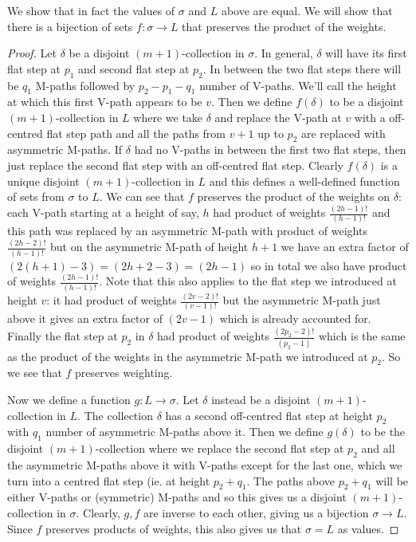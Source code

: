 \documentclass[11pt]{article}
\theoremstyle{mythm}
\begin{document}
We show that in fact the values of $\sigma$ and $L$ above are equal. We will show that there is a bijection of sets $f:\sigma \to L$ that preserves the product of the weights.

\begin{proof}
Let $\delta$ be a disjoint $(m+1)$-collection in $\sigma$. In general, $\delta$ will have its first flat step at $p_1$ and second flat step at $p_2$. In between the two flat steps there will be $q_1$ M-paths followed by $p_2-p_1-q_1$ number of V-paths. We'll call the height at which this first V-path appears to be $v$. Then we define $f(\delta)$ to be a disjoint $(m+1)$-collection in $L$ where we take $\delta$ and replace the V-path at $v$ with a off-centred flat step path and all the paths from $v+1$ up to $p_2$ are replaced with asymmetric M-paths. If $\delta$ had no V-paths in between the first two flat steps, then just replace the second flat step with an off-centred flat step. Clearly $f(\delta)$ is a unique disjoint $(m+1)$-collection in $L$ and this defines a well-defined function of sets from $\sigma$ to $L$. We can see that $f$ preserves the product of the weights on $\delta$: each V-path starting at a height of say, $h$ had product of weights $\frac{(2h-1)!}{(h-1)!}$ and this path was replaced by an asymmetric M-path with product of weights $\frac{(2h-2)!}{(h-1)!}$ but on the asymmetric M-path of height $h+1$ we have an extra factor of $(2(h+1)-3) = (2h+2-3) = (2h-1)$ so in total we also have product of weights $\frac{(2h-1)!}{(h-1)!}$. Note that this also applies to the flat step we introduced at height $v$: it had product of weights $\frac{(2v-2)!}{(v-1)!}$ but the asymmetric M-path just above it gives an extra factor of $(2v-1)$ which is already accounted for. Finally the flat step at $p_2$ in $\delta$ had product of weights $\frac{(2p_2-2)!}{(p_2-1)}$ which is the same as the product of the weights in the asymmetric M-path we introduced at $p_2$. So we see that $f$ preserves weighting.

Now we define a function $g:L\to\sigma$. Let $\delta$ instead be a disjoint $(m+1)$-collection in $L$. The collection $\delta$ has a second off-centred flat step at height $p_2$ with $q_1$ number of asymmetric M-paths above it. Then we define $g(\delta)$ to be the disjoint $(m+1)$-collection where we replace the second flat step at $p_2$ and all the asymmetric M-paths above it with V-paths except for the last one, which we turn into a centred flat step (ie. at height $p_2+q_1$. The paths above $p_2+q_1$ will be either V-paths or (symmetric) M-paths and so this gives us a disjoint $(m+1)$-collection in $\sigma$. Clearly, $g,f$ are inverse to each other, giving us a bijection $\sigma\to L$. Since $f$ preserves products of weights, this also gives us that $\sigma = L$ as values.
\end{proof}
\end{document}
